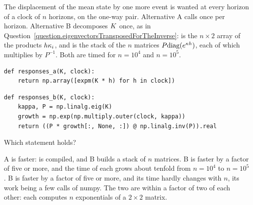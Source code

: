 \begin{question}
\label{question.meanResponseOnAClockByEigenvalues}
The displacement of the mean state by one more event is wanted
at every horizon of a clock of $n$ horizons, on the one-way pair.
Alternative A calls  once per horizon.
Alternative B decomposes $K$ once,
as in Question~\ref{question.eigenvectorsTransposedForTheInverse}:
 is the $n \times 2$ array of the products
$h\kappa_i$,
and  is the stack of the $n$ matrices
$P\mathrm{diag}(e^{\kappa h})$,
each of which  multiplies by $P^{-1}$.
Both are timed for $n = 10^{4}$ and $n = 10^{5}$.
\begin{lstlisting}[caption={Alternative A}, label=listing.meanResponseOnAClockA]
def responses_a(K, clock):
    return np.array([expm(K * h) for h in clock])
\end{lstlisting}
\begin{lstlisting}[caption={Alternative B}, label=listing.meanResponseOnAClockB]
def responses_b(K, clock):
    kappa, P = np.linalg.eig(K)
    growth = np.exp(np.multiply.outer(clock, kappa))
    return ((P * growth[:, None, :]) @ np.linalg.inv(P)).real
\end{lstlisting}
Which statement holds?
\begin{choices}
 \choice A is faster:  is compiled, and B builds a stack of $n$ matrices.
 \correctchoice B is faster by a factor of five or more,
  and the time of each grows about tenfold from $n = 10^{4}$ to $n = 10^{5}$.
 \choice B is faster by a factor of five or more,
  and its time hardly changes with $n$, its work being a few calls of numpy.
 \choice The two are within a factor of two of each other:
  each computes $n$ exponentials of a $2 \times 2$ matrix.
\end{choices}
\end{question}
